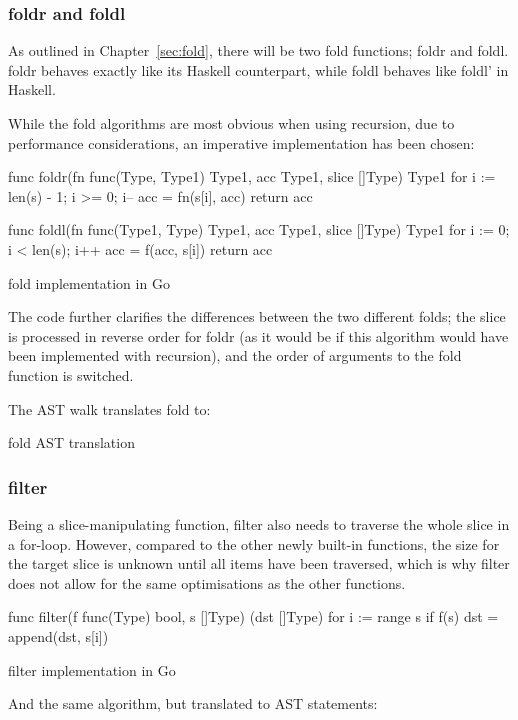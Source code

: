 \subsubsection{foldr and foldl}

As outlined in Chapter~\ref{sec:fold}, there will be two fold functions;
foldr and foldl. foldr behaves exactly like its Haskell counterpart,
while foldl behaves like foldl' in Haskell.

While the fold algorithms are most obvious when using recursion, due to
performance considerations, an imperative implementation has been chosen:

\begin{listing}
	\begin{gocode}
func foldr(fn func(Type, Type1) Type1, acc Type1, slice []Type) Type1 {
	for i := len(s) - 1; i >= 0; i-- {
		acc = fn(s[i], acc)
	}
	return acc
}

func foldl(fn func(Type1, Type) Type1, acc Type1, slice []Type) Type1 {
	for i := 0; i < len(s); i++ {
		acc = f(acc, s[i])
	}
	return acc
}
\end{gocode}
	\caption{fold implementation in Go}
\end{listing}
The code further clarifies the differences between the two different folds;
the slice is processed in reverse order for foldr (as it would be if this
algorithm would have been implemented with recursion), and the order of
arguments to the fold function is switched.

The AST walk translates fold to:
\begin{code}
	\caption{fold AST translation\autocite{fold-walk-implementation}}
\end{code}
\subsubsection{filter}\label{ch:impl-filter}

Being a slice-manipulating function, filter also needs to traverse the whole
slice in a for-loop. However, compared to the other newly built-in functions,
the size for the target slice is unknown until all items have been traversed,
which is why filter does not allow for the same optimisations as the other
functions.

\begin{code}
	\begin{gocode}
func filter(f func(Type) bool, s []Type) (dst []Type) {
	for i := range s {
			if f(s) {
				dst = append(dst, s[i])
			}
	}
}
	\end{gocode}
	\caption{filter implementation in Go}
\end{code}
And the same algorithm, but translated to AST statements:

